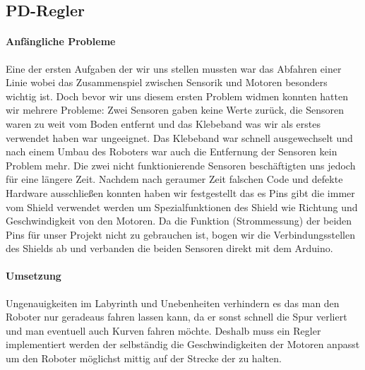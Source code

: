 \documentclass[12pt]{article}
\begin{document}
\subsection{PD-Regler}
\paragraph{Anfängliche Probleme} Eine der ersten Aufgaben der wir uns stellen mussten war das Abfahren einer Linie wobei das Zusammenspiel zwischen Sensorik und Motoren besonders wichtig ist. Doch bevor wir uns diesem ersten Problem widmen konnten hatten wir mehrere Probleme: Zwei Sensoren gaben keine Werte zurück, die Sensoren waren zu weit vom Boden entfernt und das Klebeband was wir als erstes verwendet haben war ungeeignet. Das Klebeband war schnell ausgewechselt und nach einem Umbau des Roboters war auch die Entfernung der Sensoren kein Problem mehr. Die zwei nicht funktionierende Sensoren beschäftigten uns jedoch für eine längere Zeit. Nachdem nach geraumer Zeit falschen Code und defekte Hardware ausschließen konnten haben wir festgestellt das es Pins gibt die immer vom Shield verwendet werden um Spezialfunktionen des Shield wie Richtung und Geschwindigkeit von den Motoren. Da die Funktion (Strommessung) der beiden  Pins für unser Projekt nicht zu gebrauchen ist, bogen wir die Verbindungsstellen des Shields ab und verbanden die beiden Sensoren direkt mit dem Arduino.
\paragraph{Umsetzung} Ungenauigkeiten im Labyrinth und Unebenheiten verhindern es das man den Roboter nur geradeaus fahren lassen kann, da er sonst schnell die Spur verliert und man eventuell auch Kurven fahren möchte. Deshalb muss ein Regler implementiert werden der selbständig die Geschwindigkeiten der Motoren anpasst um den Roboter möglichst mittig auf der Strecke der zu halten. 
\end{document}

